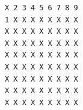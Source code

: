 \begin{Verbatim}[fontsize=\small, frame=single]
X 2 3 4 5 6 7 8 9
1 X X X X X X X X
X X X X X X X X X
X X X X X X X X X
X X X X X X X X X
X X X X X X X X X
X X X X X X X X X
X X X X X X X X X
X X X X X X X X X
\end{Verbatim}
